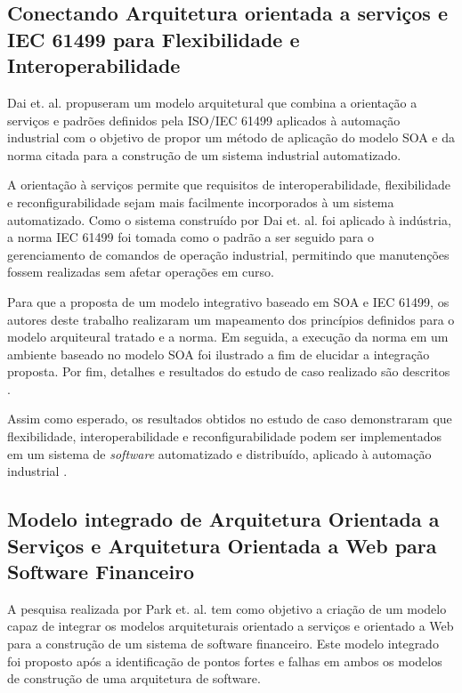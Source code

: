 \subsection{Conectando Arquitetura orientada a serviços e IEC 61499 para Flexibilidade e Interoperabilidade}

Dai et. al. \cite{dai_bridging_2015} propuseram um modelo arquitetural que combina a orientação a serviços e padrões definidos pela ISO/IEC 61499 aplicados à automação industrial com o objetivo de propor um método de aplicação do modelo SOA e da norma citada para a construção de um sistema industrial automatizado.

A orientação à serviços permite que requisitos de interoperabilidade, flexibilidade e reconfigurabilidade sejam mais facilmente incorporados à um sistema automatizado. Como o sistema construído por Dai et. al. \cite{dai_bridging_2015} foi aplicado à indústria, a norma IEC 61499 foi tomada como o padrão a ser seguido para o gerenciamento de comandos de operação industrial, permitindo que manutenções fossem realizadas sem afetar operações em curso.

Para que a proposta de um modelo integrativo baseado em SOA e IEC 61499, os autores deste trabalho realizaram um mapeamento dos princípios definidos para o modelo arquiteural tratado e a norma. Em seguida, a execução da norma em um ambiente baseado no modelo SOA foi ilustrado a fim de elucidar a integração proposta. Por fim, detalhes e resultados do estudo de caso realizado são descritos \cite{dai_bridging_2015}.

Assim como esperado, os resultados obtidos no estudo de caso demonstraram que flexibilidade, interoperabilidade e reconfigurabilidade podem ser implementados em um sistema de \textit{software} automatizado e distribuído, aplicado à automação industrial \cite{dai_bridging_2015}.


\subsection{Modelo integrado de Arquitetura Orientada a Serviços e Arquitetura Orientada a Web para Software Financeiro}
A pesquisa realizada por Park et. al. \cite{park_integrated_2012} tem como objetivo a criação de um modelo capaz de integrar os modelos arquiteturais orientado a serviços e orientado a Web para a construção de um sistema de software financeiro. Este modelo integrado foi proposto após a identificação de pontos fortes e falhas em ambos os modelos de construção de uma arquitetura de software.

